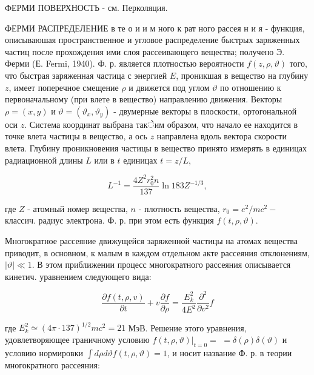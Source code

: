 \documentclass[10pt]{article}
\begin{document}
ФЕРМИ ПОВЕРХНОСТЬ - см. Перколяция.



ФЕРМИ РАСПРЕДЕЛЕНИЕ в те о и и м ного к рат ного рассея н и я - функция, описываюшая пространственное и угловое распределение быстрых заряженных частиц после прохождения ими слоя рассеивающего вещества; получено Э. Ферми (Е. Fermi, 1940). Ф. р. является плотностью вероятности $f(z, \rho, \vartheta)$ того, что быстрая заряженная частица с энергией $E$, проникшая в вещество на глубину $z$, имеет поперечное смещение $\rho$ и движется под углом $\vartheta$ по отношению к первоначальному (при влете в вещество) направлению движения. Векторы $\rho=(x, y)$ и $\vartheta=\left(\vartheta_{x}, \vartheta_{y}\right)$ - двумерные векторы в плоскости, ортогональной оси $z$. Система координат выбрана такेим образом, что начало ее находится в точке влета частицы в вещество, а ось $z$ направлена вдоль вектора скорости влета. Глубину проникновения частицы в вещество принято измерять в единицах радиационной длины $L$ или в $t$ единицах $t=z / L$,



\[

L^{-1}=\frac{4 Z^{2} r_{0}^{2} n}{137} \ln 183 Z^{-1 / 3},

\]



где $Z$ - атомный номер вещества, $n$ - плотность вещества, $r_{0}=e^{2} / m c^{2}-$ классич. радиус электрона. Ф. р. при этом есть функция $f(t, \rho, \vartheta)$.



Многократное рассеяние движущейся заряженной частицы на атомах вещества приводит, в основном, к малым в каждом отдельном акте рассеяния отклонениям, $|\vartheta| \ll 1$. В этом приближении процесс многократного рассеяния описывается кинетич. уравнением следующего вида:



\[

\frac{\partial f(t, \rho, v)}{\partial t}+v \frac{\partial f}{\partial \rho}=\frac{E_{k}^{2}}{4 E^{2}} \frac{\partial^{2}}{\partial v^{2}} f

\]



где $E_{k}^{2} \simeq(4 \pi \cdot 137)^{1 / 2} m c^{2}=21$ МэВ. Решение этого уравнения, удовлетворяющее граничному условию $\left.f(t, \rho, \vartheta)\right|_{t=0}=$ $=\delta(\rho) \delta(\vartheta)$ и условию нормировки $\int d \rho d \vartheta f(t, \rho, \vartheta)=1$, и носит название Ф. р. в теории многократного рассеяния:
\end{document}
